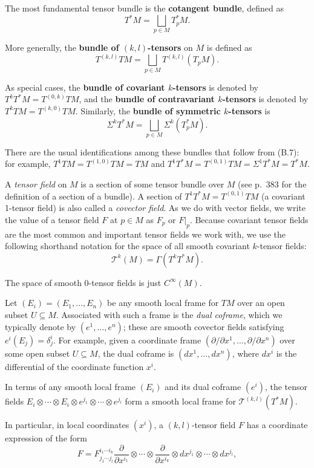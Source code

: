 The most fundamental tensor bundle is the \textbf{cotangent bundle}, defined as
\[
T^* M = \bigsqcup_{p \in M} T_p^* M.
\]

More generally, the \textbf{bundle of $(k,l)$-tensors} on $M$ is defined as
\[
T^{(k,l)} TM = \bigsqcup_{p \in M} T^{(k,l)}(T_p M).
\]

As special cases, the \textbf{bundle of covariant $k$-tensors} is denoted by $T^k T^* M = T^{(0,k)} TM$, and the \textbf{bundle of contravariant $k$-tensors} is denoted by $T^k TM = T^{(k,0)} TM$. Similarly, the \textbf{bundle of symmetric $k$-tensors} is
\[
\Sigma^k T^* M = \bigsqcup_{p \in M} \Sigma^k(T_p^* M).
\]

There are the usual identifications among these bundles that follow from (B.7): for example, $T^1 T M = T^{(1,0)} T M = T M$ and $T^1 T^* M = T^{(0,1)} T M = \Sigma^1 T^* M = T^* M$.

A \textit{tensor field} on $M$ is a section of some tensor bundle over $M$ (see p.~383 for the definition of a section of a bundle). A section of $T^1 T^* M = T^{(0,1)} T M$ (a covariant 1-tensor field) is also called a \textit{covector field}. As we do with vector fields, we write the value of a tensor field $F$ at $p \in M$ as $F_p$ or $F|_p$. Because covariant tensor fields are the most common and important tensor fields we work with, we use the following shorthand notation for the space of all smooth covariant $k$-tensor fields:
\[\mathcal{T}^k(M) = \Gamma(T^k T^* M).\]

The space of smooth 0-tensor fields is just $C^\infty(M)$.

Let $(E_i) = (E_1, \ldots, E_n)$ be any smooth local frame for $T M$ over an open subset $U \subseteq M$. Associated with such a frame is the \textit{dual coframe}, which we typically denote by $(e^1, \ldots, e^n)$; these are smooth covector fields satisfying $e^i(E_j) = \delta^i_j$. For example, given a coordinate frame $(\partial/\partial x^1, \ldots, \partial/\partial x^n)$ over some open subset $U \subseteq M$, the dual coframe is $(dx^1, \ldots, dx^n)$, where $dx^i$ is the differential of the coordinate function $x^i$.

In terms of any smooth local frame $(E_i)$ and its dual coframe $(e^i)$, the tensor fields $E_i \otimes \cdots \otimes E_i \otimes e^{j_1} \otimes \cdots \otimes e^{j_l}$ form a smooth local frame for $\mathcal{T}^{(k,l)}(T^* M)$.

In particular, in local coordinates $(x^i)$, a $(k,l)$-tensor field $F$ has a coordinate expression of the form
\begin{equation}
F = F^{i_1 \cdots i_k}_{j_1 \cdots j_l} \frac{\partial}{\partial x^{i_1}} \otimes \cdots \otimes \frac{\partial}{\partial x^{i_k}} \otimes dx^{j_1} \otimes \cdots \otimes dx^{j_l}, \tag{B.8}
\end{equation}

